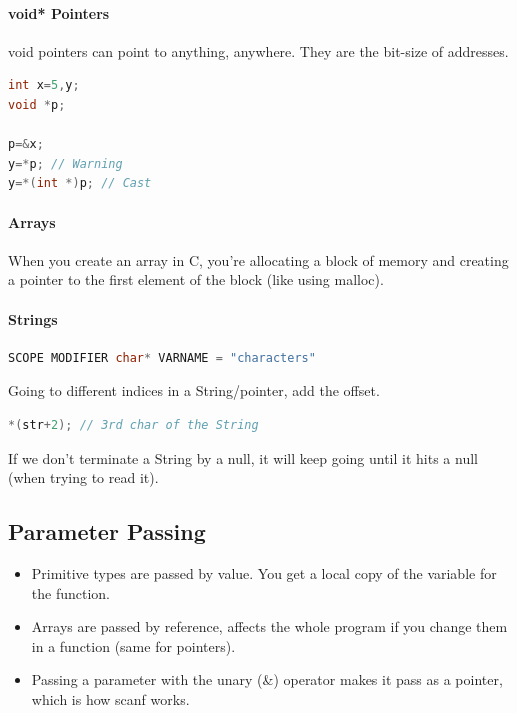 \documentclass[12 pt]{article}
\begin{document}
\paragraph{void* Pointers} void pointers can point to anything, anywhere. They are the bit-size of addresses.
\begin{lstlisting}[language=c]
int x=5,y;
void *p;

p=&x;
y=*p; // Warning
y=*(int *)p; // Cast
\end{lstlisting}
\paragraph{Arrays} When you create an array in C, you're allocating a block of memory and creating a pointer to the first element of the block (like using malloc).
\paragraph{Strings}
\begin{lstlisting}[language=c]
SCOPE MODIFIER char* VARNAME = "characters"
\end{lstlisting}
Going to different indices in a String/pointer, add the offset.
\begin{lstlisting}[language=c]
*(str+2); // 3rd char of the String
\end{lstlisting}
If we don't terminate a String by a null, it will keep going until it hits a null
(when trying to read it).
\subsection{Parameter Passing}
\begin{itemize}
\item Primitive types are passed by value. You get a local copy of the variable for the function.
\item Arrays are passed by reference, affects the whole program if you change them in a function (same for pointers).
\item Passing a parameter with the unary (\&) operator makes it pass as a pointer, which is how scanf works.
\end{itemize}
\end{document}
